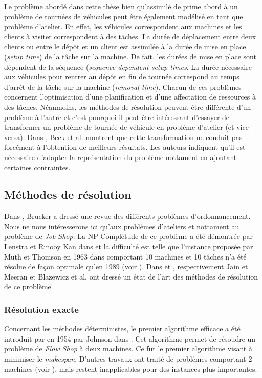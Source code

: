 Le problème abordé dans cette thèse bien qu'assimilé de prime abord à un problème de tournées de véhicules peut être également modélisé en tant que problème d'atelier. En effet, les véhicules correspondent aux machines et les clients à visiter correspondent à des tâches. La durée de déplacement entre deux clients ou entre le dépôt et un client est assimilée à la durée de mise en place (\textit{setup time}) de la tâche sur la machine. De fait, les durées de mise en place sont dépendent de la séquence (\textit{sequence dependent setup times}. La durée nécessaire aux véhicules pour rentrer au dépôt en fin de tournée correspond au temps d'arrêt de la tâche sur la machine (\textit{removal time}).
Chacun de ces problèmes concernent l'optimisation d'une planification et d'une affectation de ressources à des tâches. Néanmoins, les méthodes de résolution peuvent être différente d'un problème à l'autre et c'est pourquoi il peut être intéressant d'essayer de transformer un problème de tournée de véhicule en problème d'atelier (et vice versa).
Dans \cite{Beck2003,Beck2006}, Beck et al. montrent que cette transformation ne conduit pas forcément à l'obtention de meilleurs résultats. Les auteurs indiquent qu'il est nécessaire d'adapter la représentation du problème nottament en ajoutant certaines contraintes.

\subsection{Méthodes de résolution} \label{chap:art:sec:jssp:subsec:methodeReso}

Dans \cite{Brucker2007}, Brucker a dressé une revue des différents problèmes d'ordonnancement. Nous ne nous intéresserons ici qu'aux problèmes d'ateliers et nottament au problème de \textit{Job Shop}. La NP-Complétude de ce problème a été démontrée par Lenstra et Rinooy Kan dans \cite{Lenstra1979} et la difficulté est telle que l'instance proposée par Muth et Thomson en 1963 dans \cite{Muth1963} comportant 10 machines et 10 tâches n'a été résolue de façon optimale qu'en 1989 (voir \cite{Carlier1989}). Dans \cite{Jain1998} et \cite{Blazewicz1996}, respectivement Jain et Meeran et Blazewicz et al. ont dressé un état de l'art des méthodes de résolution de ce problème.

\subsubsection{Résolution exacte}
Concernant les méthodes déterministes, le premier algorithme efficace a été introduit par en 1954 par Johnson dans \cite{Johnson1954}. Cet algorithme permet de résoudre un problème de \textit{Flow Shop} à deux machines. Ce fut le premier algorithme visant à minimiser le \textit{makespan}. D'autres travaux ont traité de problèmes comportant 2 machines (voir \cite{Akers1956,Jackson1956,Hefetz1982}), mais restent inapplicables pour des instances plus importantes.

